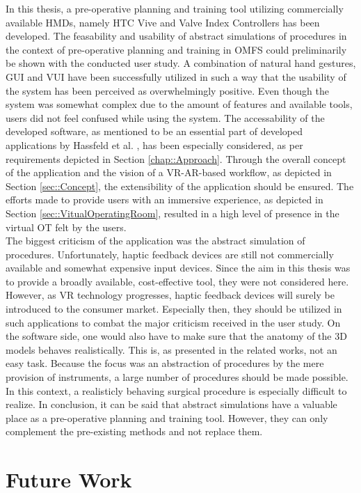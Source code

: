 In this thesis, a pre-operative planning and training tool utilizing
commercially available HMDs, namely HTC Vive and Valve Index Controllers
has been developed. The feasability and usability of 
abstract simulations of procedures in the context of pre-operative planning
and training in OMFS could preliminarily be shown with the conducted user study.
A combination of natural hand gestures, GUI and VUI have been
successfully utilized in such a way that the usability
of the system has been perceived as overwhelmingly positive.
Even though the system was somewhat complex due to the amount of features 
and available tools, users did not feel confused while using the system.
The accessability of the developed software, 
as mentioned to be an essential part of developed applications by
Hassfeld et al. \cite{HASSFELD20012}, has been especially considered,
as per requirements depicted in Section \ref{chap::Approach}.
Through the overall concept of the application and the vision of a VR-AR-based workflow, as depicted in Section 
\ref{sec::Concept}, the extensibility of the application should be ensured. 
The efforts made to provide users with an immersive experience,
as depicted in Section \ref{sec::VitualOperatingRoom},
resulted in a high level of presence in the virtual OT felt by the users.
\\ The biggest criticism of the application was the abstract 
simulation of procedures. Unfortunately, haptic feedback devices are still
not commercially available and somewhat expensive input devices. Since
the aim in this thesis was to provide a broadly available, cost-effective
tool, they were not considered here. However, as VR technology progresses,
haptic feedback devices will surely be introduced to the consumer market.
Especially then, they should be utilized in such applications to combat
the major criticism received in the user study.
On the software side, one would also have to make sure that 
the anatomy of the 3D models behaves realistically. This is, as 
presented in the related works, not an easy task. 
Because the focus was an abstraction of procedures by the mere provision 
of instruments, a large number of procedures should be made possible.
In this context, a realisticly behaving surgical procedure is
especially difficult to realize.
In conclusion, it can be said that abstract simulations have a valuable
place as a pre-operative planning and training tool. However, they 
can only complement the pre-existing methods and not replace them.
 
\section{Future Work}






